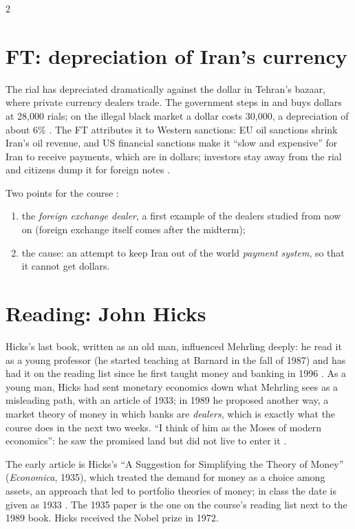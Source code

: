 \begin{paracol}{2}
\section{FT: depreciation of Iran's currency}\label{sec:bg-ft}

\begin{casestudy}
The rial has depreciated dramatically against the dollar in Tehran's bazaar, where private currency dealers trade. The government steps in and buys dollars at
28{,}000 rials; on the illegal black market a dollar costs 30{,}000, a depreciation of about 6\% . The
FT attributes it to Western sanctions: EU oil sanctions shrink Iran's oil revenue, and US financial sanctions make it ``slow and expensive'' for Iran to receive
payments, which are in dollars; investors stay away from the rial and citizens dump it for foreign notes .
\end{casestudy}
Two points for the course :
\begin{enumerate}
  \item the \emph{foreign exchange dealer}, a first example of the dealers studied from now on (foreign exchange itself comes after the midterm);
  \item the cause: an attempt to keep Iran out of the world \emph{payment system}, so that it cannot get dollars.
\end{enumerate}

\section{Reading: John Hicks}\label{sec:bg-hicks}

\begin{reading}
Hicks's last book, written as an old man, influenced Mehrling deeply: he read it as a young professor (he started teaching at Barnard in the fall of 1987) and has
had it on the reading list since he first taught money and banking in 1996 . As a young man, Hicks had sent monetary economics down what
Mehrling sees as a misleading path, with an article of 1933; in 1989 he proposed another way, a market theory of money in which banks are \emph{dealers}, which is
exactly what the course does in the next two weeks. ``I think of him as the Moses of modern economics'': he saw the promised land but did not live to enter it
.
\end{reading}\begin{coursenote}
The early article is Hicks's ``A Suggestion for Simplifying the Theory of Money'' (\emph{Economica}, 1935), which treated the demand for money as a choice
among assets, an approach that led to portfolio theories of money; in class the date is given as 1933 . The 1935 paper is the one on the
course's reading list next to the 1989 book. Hicks received the Nobel prize in 1972.
\end{coursenote}


\end{paracol}
